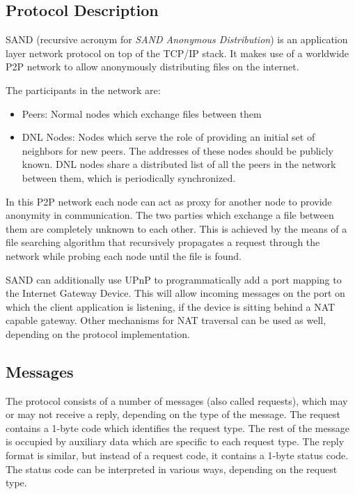 \subsection{Protocol Description}

SAND (recursive acronym for \textit{SAND Anonymous Distribution}) is an
application layer network protocol on top of the TCP/IP stack. It makes use of a
worldwide P2P network to allow anonymously distributing files on the internet.

The participants in the network are:
\begin{itemize}
    \item Peers: Normal nodes which exchange files between them
    \item DNL Nodes: Nodes which serve the role of providing an initial set of 
neighbors for new peers. The addresses of these nodes should be publicly known.
DNL nodes share a distributed list of all the peers in the network between them,
which is periodically synchronized.
\end{itemize}

In this P2P network each node can act as proxy for another node to provide
anonymity in communication. The two parties which exchange a file between them
are completely unknown to each other. This is achieved by the means of a file
searching algorithm that recursively propagates a request through the network
while probing each node until the file is found.

SAND can additionally use UPnP to programmatically add a port mapping to the 
Internet Gateway Device. This will allow incoming messages on the port on which 
the client application is listening, if the device is sitting behind a NAT 
capable gateway. Other mechanisms for NAT traversal can be used as well, 
depending on the protocol implementation.

\subsection{Messages}

The protocol consists of a number of messages (also called requests), which may 
or may not receive a reply, depending on the type of the message. The request 
contains a 1-byte code which identifies the request type. The rest of the 
message is occupied by auxiliary data which are specific to each request type. 
The reply format is similar, but instead of a request code, it contains a 
1-byte status code. The status code can be interpreted in various ways, 
depending on the request type.

